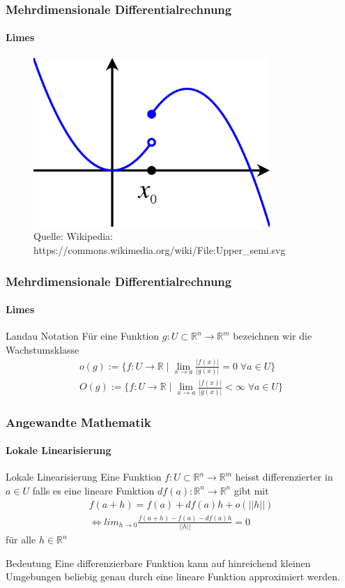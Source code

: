 \documentclass{beamer}
\begin{document}
\begin{frame}
    \frametitle{Mehrdimensionale Differentialrechnung}
\framesubtitle{Limes}

\begin{figure}[H]
      \centering
    \includegraphics[width=0.8\textwidth]{images/500px-Upper_semi}
      \caption{Quelle: Wikipedia: https://commons.wikimedia.org/wiki/File:Upper\_semi.svg}
\end{figure}

 \end{frame}

\begin{frame}
    \frametitle{Mehrdimensionale Differentialrechnung}
\framesubtitle{Limes}
    \begin{block}{Landau Notation}
Für eine Funktion $g : U \subset \mathbb{R}^n \to \mathbb{R}^m$ bezeichnen wir die Wachstumsklasse 
\begin{align*}
o(g) := \{ f : U  \to \mathbb{R} \; | \; \lim_{x \to a} \frac {|f(x)|}{|g(x)|} = 0 \; \forall a \in U \} \\
O(g) := \{ f : U  \to \mathbb{R} \; | \; \lim_{x \to a} \frac {|f(x)|}{|g(x)|} < \infty \; \forall a \in U \}
\end{align*}
\end{block}
 \end{frame}


\begin{frame}
    \frametitle{Angewandte Mathematik}
\framesubtitle{Lokale Linearisierung}
    \begin{block}{Lokale Linearisierung}
Eine Funktion  $f: U \subset \mathbb{R}^n \to \mathbb{R}^m$ heisst differenzierter  in $a \in U$ falls es eine lineare Funktion 
$df(a):  \mathbb{R}^n \to  \mathbb{R}^n$ gibt mit
\begin{align}
\label{diff}
f(a + h)  =  f(a)  +  df(a) h + o(||h||)  \\
\Leftrightarrow lim_{h \to 0} \frac{f(a + h)  -  f(a)  -  df(a)h}{||h||} = 0
\end{align}
für alle $h \in \mathbb{R}^n$
\end{block}
    \begin{block}{Bedeutung}
Eine differenzierbare Funktion kann  auf hinreichend kleinen Umgebungen 
beliebig genau durch eine lineare Funktion approximiert werden. 
\end{block}
 \end{frame}
\end{document}
